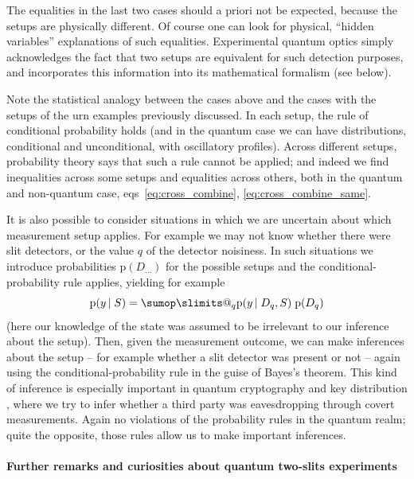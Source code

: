 \documentclass[\ifafour a4paper,12pt,\else a5paper,10pt,\fi%
onecolumn,oneside,article,%
british%
]{memoir}
\makeatletter
\theoremstyle{remark}
\theoremstyle{innote}
\def\sum{\DOTSI\sumop\slimits@}
\newcommand*{\citep}{\parencites}%
\newcommand*{\pf}{\mathrm{p}}%
\renewcommand*{\|}[1][]{\nonscript\,#1\vert\nonscript\;\mathopen{}}
\newcommand*{\eqns}{eqs}%
\newcommand*{\yDq}{D_{q}}
\makeatother
\begin{document}
The equalities in the last two cases should a priori not be expected,
because the setups are physically different. Of course one can look for
physical, \enquote{hidden variables} explanations of such equalities.
Experimental quantum optics simply acknowledges the fact that two setups
are equivalent for such detection purposes, and incorporates this
information into its mathematical formalism (see below).

\medskip

Note the statistical analogy between the cases above and the cases with the
setups of the urn examples previously discussed. In each setup, the rule of
conditional probability holds (and in the quantum case we can have
distributions, conditional and unconditional, with oscillatory profiles).
Across different setups, probability theory says that such a rule cannot be
applied; and indeed we find inequalities across some setups and equalities
across others, both in the quantum and non-quantum case,
\eqns~\eqref{eq:cross_combine}, \eqref{eq:cross_combine_same}.

\medskip

It is also possible to consider situations in which we are uncertain about
which measurement setup applies. For example we may not know whether there
were slit detectors, or the value $q$ of the detector noisiness. In such
situations we introduce probabilities $\pf(D_{\dotso})$ for the possible
setups and the conditional-probability rule applies, yielding for example
\begin{equation}
  \label{eq:conditional_setups}
  \pf(y \| S) = \sum_{q} \pf(y \| \yDq, S)\;\pf(\yDq)
\end{equation}
(here our knowledge of the state was assumed to be irrelevant to our
inference about the setup). Then, given the measurement outcome, we can
make inferences about the setup
\citep{barnettetal2003,zimanetal2004_r2006,darianoetal2004}[see
also][]{rigoetal1998} -- for example whether a slit detector was present or
not -- again using the conditional-probability rule in the guise of Bayes's
theorem. This kind of inference is especially important in quantum
cryptography and key distribution \citep{nielsenetal2000_r2010}, where we
try to infer whether a third party was eavesdropping through covert
measurements. Again no violations of the probability rules in the quantum
realm; quite the opposite, those rules allow us to make important
inferences.


\bigskip

\paragraph{Further remarks and curiosities about quantum two-slits
  experiments}
\end{document}
